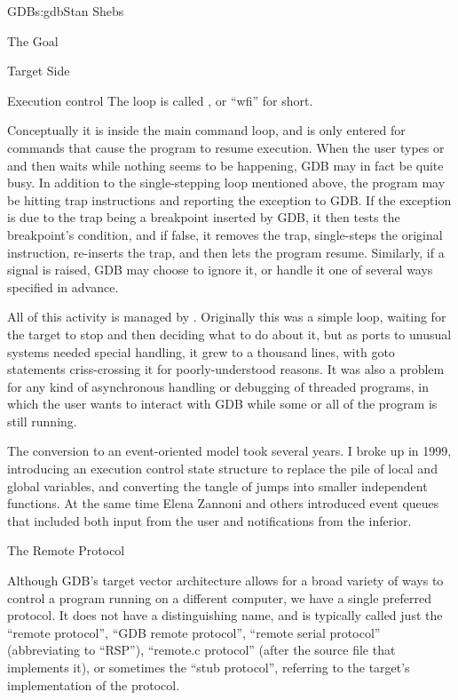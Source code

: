 \begin{aosachapter}{GDB}{s:gdb}{Stan Shebs}
\begin{aosasect1}{The Goal}
\begin{aosasect1}{Target Side}
\begin{aosasect2}{Execution control}
The loop is called , or ``wfi'' for short.

Conceptually it is inside the main command loop, and is only entered
for commands that cause the program to resume execution.  When the
user types  or  and then waits while nothing seems
to be happening, GDB may in fact be quite busy.  In addition to the
single-stepping loop mentioned above, the program may be hitting trap
instructions and reporting the exception to GDB.  If the exception is
due to the trap being a breakpoint inserted by GDB, it then tests the
breakpoint's condition, and if false, it removes the trap,
single-steps the original instruction, re-inserts the trap, and then
lets the program resume.  Similarly, if a signal is raised, GDB may
choose to ignore it, or handle it one of several ways specified in
advance.

All of this activity is managed by .
Originally this was a simple loop, waiting for the target to stop and
then deciding what to do about it, but as ports to unusual systems
needed special handling, it grew to a thousand lines, with goto
statements criss-crossing it for poorly-understood reasons.  It was
also a problem for any kind of asynchronous handling or debugging of
threaded programs, in which the user wants to interact with GDB while
some or all of the program is still running.

The conversion to an event-oriented model took several years.  I broke
up  in 1999, introducing an execution control state
structure to replace the pile of local and global variables, and
converting the tangle of jumps into smaller independent functions.  At
the same time Elena Zannoni and others introduced event queues that
included both input from the user and notifications from the inferior.

\end{aosasect2}

\begin{aosasect2}{The Remote Protocol}

Although GDB's target vector architecture allows for a broad variety
of ways to control a program running on a different computer, we have
a single preferred protocol.  It does not have a distinguishing name,
and is typically called just the ``remote protocol'', ``GDB remote
protocol'', ``remote serial protocol'' (abbreviating to ``RSP''),
``remote.c protocol'' (after the source file that implements it), or
sometimes the ``stub protocol'', referring to the target's
implementation of the protocol.


\end{aosasect2}
\end{aosasect1}
\end{aosasect1}
\end{aosachapter}
